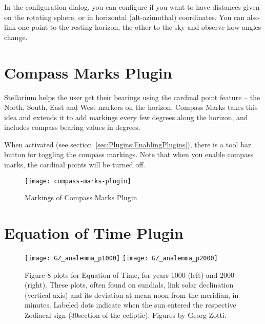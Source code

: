 \noindent In the configuration dialog, you can configure if you want to have
distances given on the rotating sphere, or in horizontal
(alt-azimuthal) coordinates. You can also link one point to the
resting horizon, the other to the sky and observe how angles change.

\newpage

\section{Compass Marks Plugin}
\label{sec:plugins:CompassMarks}


Stellarium helps the user get their bearings using the cardinal point
feature -- the North, South, East and West markers on the horizon.
Compass Marks takes this idea and extends it to add markings every few
degrees along the horizon, and includes compass bearing values in
degrees.

When activated (see section~\ref{sec:Plugins:EnablingPlugins}), there
is a tool bar button  for toggling the
compass markings.  Note that when you enable compass marks, the
cardinal points will be turned off.

\begin{figure}[ht]\centering
\texttt{[image: compass-marks-plugin]}
\caption{Markings of Compass Marks Plugin}
\label{fig:plugins:CompassMarks}
\end{figure}



\newpage
\section{Equation of Time Plugin}
\label{sec:plugins:EquationOfTime}


\begin{figure}[h]\centering
\texttt{[image: GZ\_analemma\_p1000]}
\texttt{[image: GZ\_analemma\_p2000]}
\caption{Figure-8 plots for Equation of Time, for years 1000 (left)
  and 2000 (right). These plots, often found on sundials, link solar
  declination (vertical axis) and its deviation at mean noon from the
  meridian, in minutes. Labeled dots indicate when the sun entered the
  respective Zodiacal sign (30\degree section of the
  ecliptic). Figures by Georg Zotti.}
\label{fig:EqOfTime}
\end{figure}


